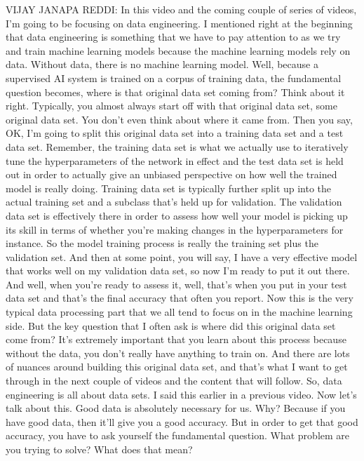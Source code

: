 VIJAY JANAPA REDDI: In this video and the coming couple of series of videos,
I'm going to be focusing on data engineering.
I mentioned right at the beginning that data engineering is something
that we have to pay attention to as we try and train machine learning models
because the machine learning models rely on data.
Without data, there is no machine learning model.
Well, because a supervised AI system is trained on a corpus of training data,
the fundamental question becomes, where is that original data set coming from?
Think about it right.
Typically, you almost always start off with that original data set,
some original data set.
You don't even think about where it came from.
Then you say, OK, I'm going to split this original data set into a training
data set and a test data set.
Remember, the training data set is what we actually
use to iteratively tune the hyperparameters of the network
in effect and the test data set is held out in order to actually give
an unbiased perspective on how well the trained model is really doing.
Training data set is typically further split up
into the actual training set and a subclass that's held up for validation.
The validation data set is effectively there
in order to assess how well your model is picking up
its skill in terms of whether you're making changes
in the hyperparameters for instance.
So the model training process is really the training
set plus the validation set.
And then at some point, you will say, I have a very effective model
that works well on my validation data set,
so now I'm ready to put it out there.
And well, when you're ready to assess it,
well, that's when you put in your test data set
and that's the final accuracy that often you report.
Now this is the very typical data processing part
that we all tend to focus on in the machine learning side.
But the key question that I often ask is where did this original data
set come from?
It's extremely important that you learn about this process
because without the data, you don't really have anything to train on.
And there are lots of nuances around building this original data set,
and that's what I want to get through in the next couple of videos
and the content that will follow.
So, data engineering is all about data sets.
I said this earlier in a previous video.
Now let's talk about this.
Good data is absolutely necessary for us.
Why?
Because if you have good data, then it'll give you a good accuracy.
But in order to get that good accuracy, you
have to ask yourself the fundamental question.
What problem are you trying to solve?
What does that mean?

